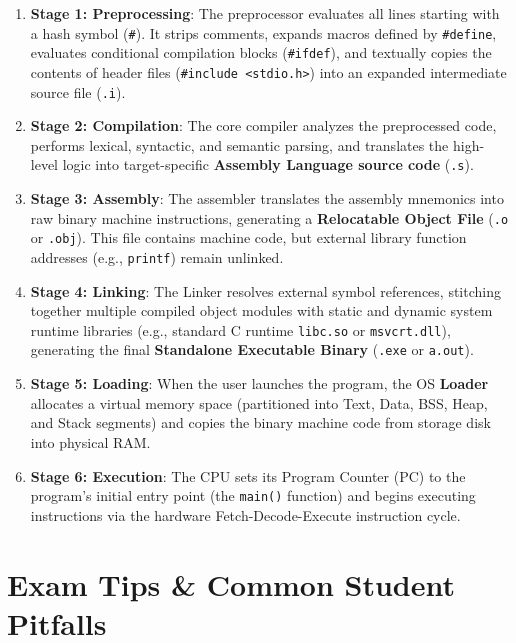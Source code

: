 \begin{enumerate}[leftmargin=1.5em]
    \item \textbf{Stage 1: Preprocessing}: The preprocessor evaluates all lines starting with a hash symbol (\texttt{\#}). It strips comments, expands macros defined by \texttt{\#define}, evaluates conditional compilation blocks (\texttt{\#ifdef}), and textually copies the contents of header files (\texttt{\#include <stdio.h>}) into an expanded intermediate source file (\texttt{.i}).
    \item \textbf{Stage 2: Compilation}: The core compiler analyzes the preprocessed code, performs lexical, syntactic, and semantic parsing, and translates the high-level logic into target-specific \textbf{Assembly Language source code} (\texttt{.s}).
    \item \textbf{Stage 3: Assembly}: The assembler translates the assembly mnemonics into raw binary machine instructions, generating a \textbf{Relocatable Object File} (\texttt{.o} or \texttt{.obj}). This file contains machine code, but external library function addresses (e.g., \texttt{printf}) remain unlinked.
    \item \textbf{Stage 4: Linking}: The Linker resolves external symbol references, stitching together multiple compiled object modules with static and dynamic system runtime libraries (e.g., standard C runtime \texttt{libc.so} or \texttt{msvcrt.dll}), generating the final \textbf{Standalone Executable Binary} (\texttt{.exe} or \texttt{a.out}).
    \item \textbf{Stage 5: Loading}: When the user launches the program, the OS \textbf{Loader} allocates a virtual memory space (partitioned into Text, Data, BSS, Heap, and Stack segments) and copies the binary machine code from storage disk into physical RAM.
    \item \textbf{Stage 6: Execution}: The CPU sets its Program Counter (PC) to the program's initial entry point (the \texttt{main()} function) and begins executing instructions via the hardware Fetch-Decode-Execute instruction cycle.
\end{enumerate}

\section{Exam Tips \& Common Student Pitfalls}

